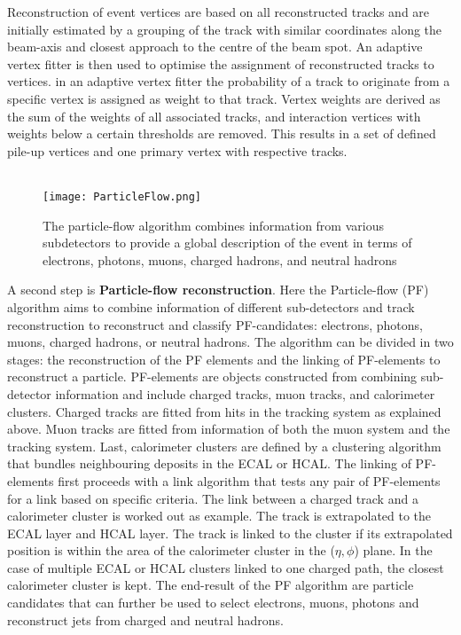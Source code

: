 Reconstruction of event vertices are based on all reconstructed tracks and are initially estimated by a grouping of the track with similar coordinates along the beam-axis and closest approach to the centre of the beam spot. An adaptive vertex fitter\cite{Fruhwirth:2007hz} is then used to optimise the  assignment of reconstructed tracks to vertices. in an adaptive vertex fitter the probability of a track to originate from a specific vertex is assigned as weight to that track. Vertex weights are derived as the sum of the weights of all associated tracks, and interaction vertices with weights below a certain thresholds are removed. This results in a set of defined pile-up vertices and one primary vertex with respective tracks.\\
\\
\begin{figure}[t]
    \texttt{[image: ParticleFlow.png]}
    \caption{The particle-flow algorithm combines information from various subdetectors to provide a global description of the event in terms of electrons, photons, muons, charged hadrons, and neutral hadrons\cite{Defranchis:2020efl}}
    \label{Fig:P}
\end{figure}
A second step is \textbf{Particle-flow reconstruction}. Here the Particle-flow (PF) algorithm aims to combine information of different sub-detectors and track reconstruction to reconstruct and classify PF-candidates: electrons, photons, muons, charged hadrons, or neutral hadrons. The algorithm can be divided in two stages: the reconstruction of the PF elements and the linking of PF-elements to reconstruct a particle. PF-elements are objects constructed from combining sub-detector information and include charged tracks, muon tracks, and calorimeter clusters. Charged tracks are fitted from hits in the tracking system as explained above. Muon tracks are fitted from information of both the muon system and the tracking system. Last, calorimeter clusters are defined by a clustering algorithm that bundles neighbouring deposits in the ECAL or HCAL. The linking of PF-elements first proceeds with a link algorithm that tests any pair of PF-elements for a link based on specific criteria. The link between a charged track and a calorimeter cluster is worked out as example. The track is extrapolated to the ECAL layer and HCAL layer. The track is linked to the cluster if its extrapolated position is within the area of the calorimeter cluster in the ($\eta,\phi$) plane. In the case of multiple ECAL or HCAL clusters linked to one charged path, the closest calorimeter cluster is kept. The end-result of the PF algorithm are particle candidates that can further be used to select electrons, muons, photons and reconstruct jets from charged and neutral hadrons.

